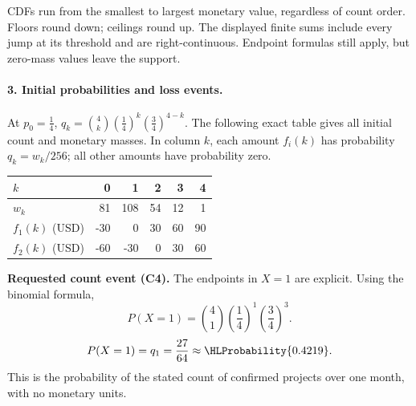 CDFs run from the smallest to largest monetary value, regardless of count order. Floors round down; ceilings round up. The displayed finite sums include every jump at its threshold and are right-continuous. Endpoint formulas still apply, but zero-mass values leave the support.
\clearpage\paragraph{3. Initial probabilities and loss events.}
At $p_0=\frac{1}{4}$, $q_k=\binom{4}k(\frac{1}{4})^k(\frac{3}{4})^{4-k}$. The following exact table gives all initial count and monetary masses. In column $k$, each amount $f_i(k)$ has probability $q_k=w_k/256$; all other amounts have probability zero.
\begin{center}\begin{tabular}{lrrrrr}\toprule
$k$ & 0 & 1 & 2 & 3 & 4\\\midrule
$w_k$ & 81 & 108 & 54 & 12 & 1\\
$f_1(k)$ (USD) & -30 & 0 & 30 & 60 & 90\\
$f_2(k)$ (USD) & -60 & -30 & 0 & 30 & 60\\
\bottomrule\end{tabular}\end{center}
\textbf{Requested count event (C4).} The endpoints in $X=1$ are explicit. Using the binomial formula,
\[P(X=1)=\binom{4}{1}(\frac{1}{4})^{1}(\frac{3}{4})^{3}.\]
\[P(X=1)=q_{1}=\frac{27}{64}\approx\HLProbability{0.4219}.\]
This is the probability of the stated count of confirmed projects over one month, with no monetary units.
\clearpage
